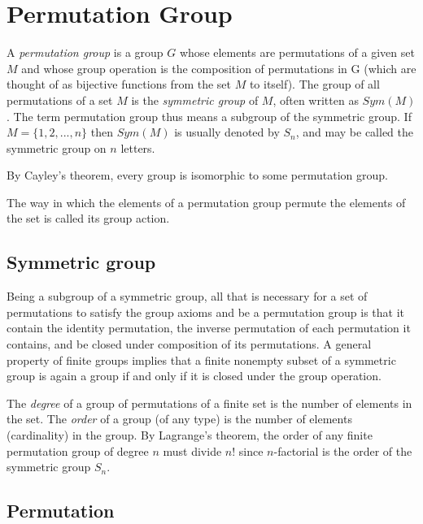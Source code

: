 \section{Permutation Group}
A \textit{permutation group} is a group $G$ whose elements are permutations of a given set $M$ and whose group
operation is the composition of permutations in G (which are thought of as bijective functions from the set $M$
to itself). The group of all permutations of a set $M$ is the \textit{symmetric group} of $M$, often written as
$Sym(M)$. The term permutation group thus means a subgroup of the symmetric group. If $M=\{1, 2, ..., n\}$ then
$Sym(M)$ is usually denoted by $S_n$, and may be called the symmetric group on $n$ letters.

By Cayley's theorem, every group is isomorphic to some permutation group.

The way in which the elements of a permutation group permute the elements of the set is called its group action.

\subsection{Symmetric group}
Being a subgroup of a symmetric group, all that is necessary for a set of permutations to satisfy the group
axioms and be a permutation group is that it contain the identity permutation, the inverse permutation of each
permutation it contains, and be closed under composition of its permutations. A general property of finite
groups implies that a finite nonempty subset of a symmetric group is again a group if and only if it is closed
under the group operation.

The \textit{degree} of a group of permutations of a finite set is the number of elements in the set.
The \textit{order} of a group (of any type) is the number of elements (cardinality) in the group. By Lagrange's
theorem, the order of any finite permutation group of degree $n$ must divide $n!$ since $n$-factorial is the
order of the symmetric group $S_n$.

\subsection{Permutation}
